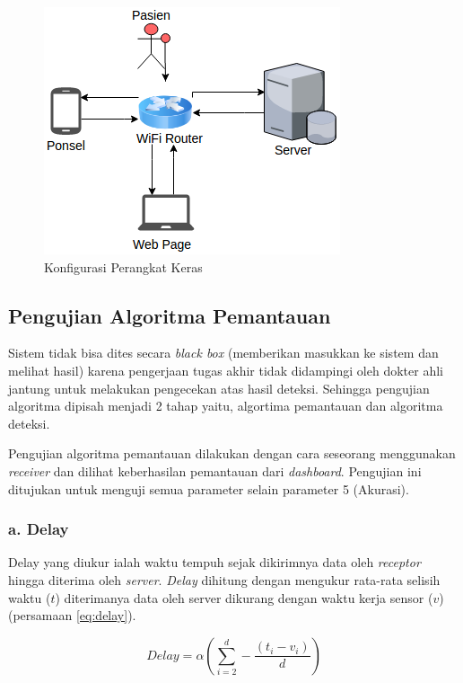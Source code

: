 \begin{figure}
	\centering
	\includegraphics[scale=0.82]{images/konfigurasi.png}
	\caption{Konfigurasi Perangkat Keras}
	\label{fig:konfigurasi}
\end{figure}

\subsection{Pengujian Algoritma Pemantauan}
Sistem tidak bisa dites secara \textit{black box} (memberikan masukkan ke sistem dan melihat hasil) karena pengerjaan tugas akhir tidak didampingi oleh dokter ahli jantung untuk melakukan pengecekan atas hasil deteksi. Sehingga pengujian algoritma dipisah menjadi  2 tahap yaitu, algortima pemantauan dan algoritma deteksi. 

Pengujian algoritma pemantauan dilakukan dengan cara seseorang menggunakan \textit{receiver} dan dilihat keberhasilan pemantauan dari \textit{dashboard}. Pengujian ini ditujukan untuk menguji semua parameter selain parameter 5 (Akurasi).

\subsubsection{a. Delay}
Delay yang diukur ialah waktu tempuh sejak dikirimnya data oleh \textit{receptor} hingga diterima oleh \textit{server}. \textit{Delay} dihitung dengan mengukur rata-rata selisih waktu ($t$) diterimanya data oleh server dikurang dengan waktu kerja sensor ($v$) (persamaan \ref{eq:delay}).

\begin{equation}
Delay = \alpha (\sum_{i=2}^{d} -\frac{(t_{i} - v_{i})}{d})
\label{eq:delay} 
\end{equation}

